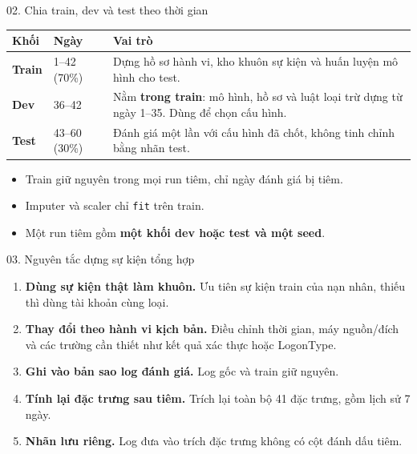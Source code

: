 \documentclass[aspectratio=169, 10pt]{beamer}
\begin{document}
\begin{frame}{02. Chia train, dev và test theo thời gian}
\normalsize
\begin{tabularx}{\linewidth}{@{}p{2cm}p{2.8cm}X@{}}
\toprule\rowcolor{socblue!10}\textbf{Khối} & \textbf{Ngày} & \textbf{Vai trò}\\\midrule
\textbf{Train} & 1--42 (70\%) & Dựng hồ sơ hành vi, kho khuôn sự kiện và huấn luyện mô hình cho test.\\[10pt]
\textbf{Dev} & 36--42 & Nằm \textbf{trong train}: mô hình, hồ sơ và luật loại trừ dựng từ ngày 1--35. Dùng để chọn cấu hình.\\[10pt]
\textbf{Test} & 43--60 (30\%) & Đánh giá một lần với cấu hình đã chốt, không tinh chỉnh bằng nhãn test.\\\bottomrule
\end{tabularx}
\vspace{1em}
\begin{itemize}\setlength\itemsep{5pt}
\item Train giữ nguyên trong mọi run tiêm, chỉ ngày đánh giá bị tiêm.
\item Imputer và scaler chỉ \texttt{fit} trên train.
\item Một run tiêm gồm \textbf{một khối dev hoặc test và một seed}.
\end{itemize}
\end{frame}

\begin{frame}{03. Nguyên tắc dựng sự kiện tổng hợp}
\normalsize
\begin{enumerate}\setlength\itemsep{10pt}
\item \textbf{Dùng sự kiện thật làm khuôn.} Ưu tiên sự kiện train của nạn nhân, thiếu thì dùng tài khoản cùng loại.
\item \textbf{Thay đổi theo hành vi kịch bản.} Điều chỉnh thời gian, máy nguồn/đích và các trường cần thiết như kết quả xác thực hoặc LogonType.
\item \textbf{Ghi vào bản sao log đánh giá.} Log gốc và train giữ nguyên.
\item \textbf{Tính lại đặc trưng sau tiêm.} Trích lại toàn bộ 41 đặc trưng, gồm lịch sử 7 ngày.
\item \textbf{Nhãn lưu riêng.} Log đưa vào trích đặc trưng không có cột đánh dấu tiêm.
\end{enumerate}
\end{frame}
\end{document}
